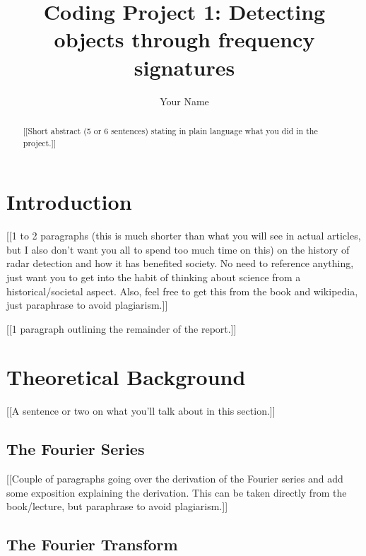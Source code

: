 \documentclass[12pt]{article}%
\begin{document}
\title{Coding Project 1:  Detecting objects through frequency signatures}

\author{Your Name}
\date{}

\maketitle


\begin{abstract}
{\color{red} [[Short abstract (5 or 6 sentences) stating in plain language what you did in the project.]]}
\end{abstract}


\section{Introduction}
\label{Sec: Intro}

{\color{red} [[1 to 2 paragraphs {\color{blue} (this is much shorter than what you will see in actual articles, but I also don't want you all to spend too much time on this)} on the history of radar detection and how it has benefited society.  No need to reference anything, just want you to get into the habit of thinking about science from a historical/societal aspect.  Also, feel free to get this from the book and wikipedia, just paraphrase to avoid plagiarism.]]}

\bigskip
\bigskip

{\color{red} [[1 paragraph outlining the remainder of the report.]]}


\section{Theoretical Background}

{\color{red}[[A sentence or two on what you'll talk about in this section.]]}


\subsection{The Fourier Series}

{\color{red}[[Couple of paragraphs going over the derivation of the Fourier series and add some exposition explaining the derivation.  This can be taken directly from the book/lecture, but paraphrase to avoid plagiarism.]]}


\subsection{The Fourier Transform}
\end{document}
